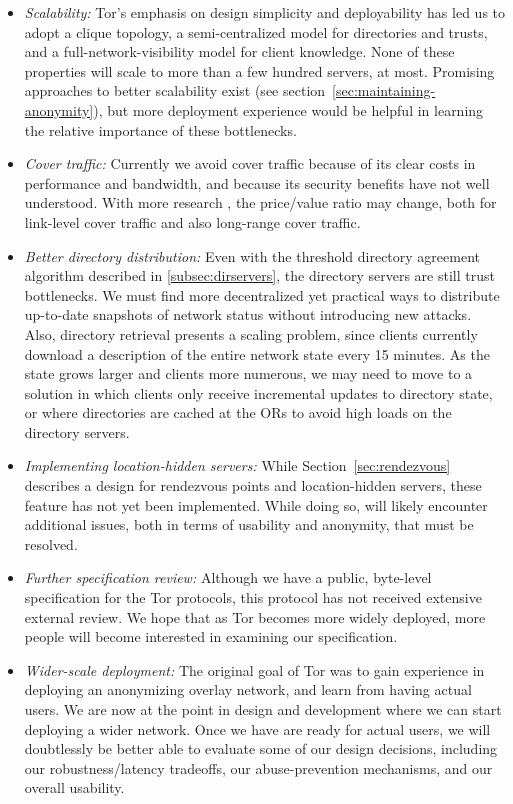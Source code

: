 \documentclass[times,10pt,twocolumn]{article}
\begin{document}
%
\begin{itemize}
\item \emph{Scalability:} Tor's emphasis on design simplicity and
  deployability has led us to adopt a clique topology, a
  semi-centralized model for directories and trusts, and a
  full-network-visibility model for client knowledge.  None of these
  properties will scale to more than a few hundred servers, at most.
  Promising approaches to better scalability exist (see
  section~\ref{sec:maintaining-anonymity}), but more deployment
  experience would be helpful in learning the relative importance of
  these bottlenecks.
\item \emph{Cover traffic:} Currently we avoid cover traffic because
  of its clear costs in performance and bandwidth, and because its
  security benefits have not well understood. With more research
  \cite{SS03,defensive-dropping}, the price/value ratio may change,
  both for link-level cover traffic and also long-range cover traffic.
\item \emph{Better directory distribution:} Even with the threshold
  directory agreement algorithm described in \ref{subsec:dirservers},
  the directory servers are still trust bottlenecks. We must find more
  decentralized yet practical ways to distribute up-to-date snapshots of
  network status without introducing new attacks.  Also, directory
  retrieval presents a scaling problem, since clients currently
  download a description of the entire network state every 15
  minutes.  As the state grows larger and clients more numerous, we
  may need to move to a solution in which clients only receive
  incremental updates to directory state, or where directories are
  cached at the ORs to avoid high loads on the directory servers.
\item \emph{Implementing location-hidden servers:} While
  Section~\ref{sec:rendezvous} describes a design for rendezvous
  points and location-hidden servers, these feature has not yet been
  implemented.  While doing so, will likely encounter additional
  issues, both in terms of usability and anonymity, that must be
  resolved.
\item \emph{Further specification review:} Although we have a public,
  byte-level specification for the Tor protocols, this protocol has
  not received extensive external review.  We hope that as Tor
  becomes more widely deployed, more people will become interested in
  examining our specification.
\item \emph{Wider-scale deployment:} The original goal of Tor was to
  gain experience in deploying an anonymizing overlay network, and
  learn from having actual users.  We are now at the point in design
  and development where we can start deploying a wider network.  Once
  we have are ready for actual users, we will doubtlessly be better
  able to evaluate some of our design decisions, including our
  robustness/latency tradeoffs, our abuse-prevention mechanisms, and
  our overall usability.
\end{itemize}
\end{document}
